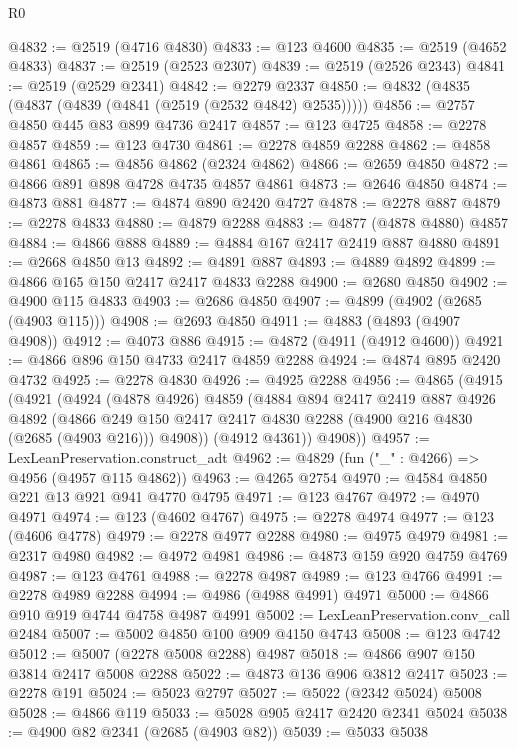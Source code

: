 \begin{lexlean}{R0}
\begin{coremodule}
@4832 := @2519 (@4716 @4830)
@4833 := @123 @4600
@4835 := @2519 (@4652 @4833)
@4837 := @2519 (@2523 @2307)
@4839 := @2519 (@2526 @2343)
@4841 := @2519 (@2529 @2341)
@4842 := @2279 @2337
@4850 := @4832 (@4835 (@4837 (@4839 (@4841 (@2519 (@2532 @4842) @2535)))))
@4856 := @2757 @4850 @445 @83 @899 @4736 @2417
@4857 := @123 @4725
@4858 := @2278 @4857
@4859 := @123 @4730
@4861 := @2278 @4859 @2288
@4862 := @4858 @4861
@4865 := @4856 @4862 (@2324 @4862)
@4866 := @2659 @4850
@4872 := @4866 @891 @898 @4728 @4735 @4857 @4861
@4873 := @2646 @4850
@4874 := @4873 @881
@4877 := @4874 @890 @2420 @4727
@4878 := @2278 @887
@4879 := @2278 @4833
@4880 := @4879 @2288
@4883 := @4877 (@4878 @4880) @4857
@4884 := @4866 @888
@4889 := @4884 @167 @2417 @2419 @887 @4880
@4891 := @2668 @4850 @13
@4892 := @4891 @887
@4893 := @4889 @4892
@4899 := @4866 @165 @150 @2417 @2417 @4833 @2288
@4900 := @2680 @4850
@4902 := @4900 @115 @4833
@4903 := @2686 @4850
@4907 := @4899 (@4902 (@2685 (@4903 @115)))
@4908 := @2693 @4850
@4911 := @4883 (@4893 (@4907 @4908))
@4912 := @4073 @886
@4915 := @4872 (@4911 (@4912 @4600))
@4921 := @4866 @896 @150 @4733 @2417 @4859 @2288
@4924 := @4874 @895 @2420 @4732
@4925 := @2278 @4830
@4926 := @4925 @2288
@4956 := @4865
    (@4915
      (@4921
        (@4924
          (@4878 @4926)
          @4859
          (@4884
            @894
            @2417
            @2419
            @887
            @4926
            @4892
            (@4866 @249 @150 @2417 @2417 @4830 @2288 (@4900 @216 @4830 (@2685 (@4903 @216))) @4908))
          (@4912 @4361))
        @4908))
@4957 := LexLeanPreservation.construct_adt
@4962 := @4829 (fun ("_" : @4266) => @4956 (@4957 @115 @4862))
@4963 := @4265 @2754
@4970 := @4584 @4850 @221 @13 @921 @941 @4770 @4795
@4971 := @123 @4767
@4972 := @4970 @4971
@4974 := @123 (@4602 @4767)
@4975 := @2278 @4974
@4977 := @123 (@4606 @4778)
@4979 := @2278 @4977 @2288
@4980 := @4975 @4979
@4981 := @2317 @4980
@4982 := @4972 @4981
@4986 := @4873 @159 @920 @4759 @4769
@4987 := @123 @4761
@4988 := @2278 @4987
@4989 := @123 @4766
@4991 := @2278 @4989 @2288
@4994 := @4986 (@4988 @4991) @4971
@5000 := @4866 @910 @919 @4744 @4758 @4987 @4991
@5002 := LexLeanPreservation.conv_call @2484
@5007 := @5002 @4850 @100 @909 @4150 @4743
@5008 := @123 @4742
@5012 := @5007 (@2278 @5008 @2288) @4987
@5018 := @4866 @907 @150 @3814 @2417 @5008 @2288
@5022 := @4873 @136 @906 @3812 @2417
@5023 := @2278 @191
@5024 := @5023 @2797
@5027 := @5022 (@2342 @5024) @5008
@5028 := @4866 @119
@5033 := @5028 @905 @2417 @2420 @2341 @5024
@5038 := @4900 @82 @2341 (@2685 (@4903 @82))
@5039 := @5033 @5038

\end{coremodule}
\end{lexlean}
